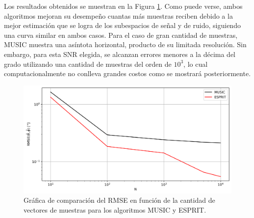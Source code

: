 Los resultados obtenidos se muestran en la Figura \ref{fig:doaest_error_vs_n}. Como puede verse, ambos algoritmos mejoran su desempeño cuantas más muestras reciben debido a la mejor estimación que se logra de los subespacios de señal y de ruido, siguiendo una curva similar en ambos casos. Para el caso de gran cantidad de muestras, MUSIC muestra una asíntota horizontal, producto de su limitada resolución. Sin embargo, para esta SNR elegida, se alcanzan errores menores a la décima del grado utilizando una cantidad de muestras del orden de $10^3$, lo cual computacionalmente no conlleva grandes costos como se mostrará posteriormente.
\begin{figure}[ht!]
    \centering
    \includegraphics[width=0.9\linewidth]{images/03-DOAEst/error_vs_n.png}
    \caption{Gráfica de comparación del RMSE en función de la cantidad de vectores de muestras para los algoritmos MUSIC y ESPRIT.}
    \label{fig:doaest_error_vs_n}
\end{figure}


